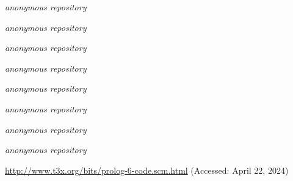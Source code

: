 \documentclass[10pt,anonymous,review]{acmart}
\begin{document}
\begin{thebibliography}{9}
\emph{anonymous repository}

\emph{anonymous repository}

\emph{anonymous repository}

\emph{anonymous repository}

\emph{anonymous repository}

\emph{anonymous repository}

\emph{anonymous repository}

\emph{anonymous repository}

\url{http://www.t3x.org/bits/prolog-6-code.scm.html} (Accessed: April 22, 2024)

\end{thebibliography}
\end{document}
